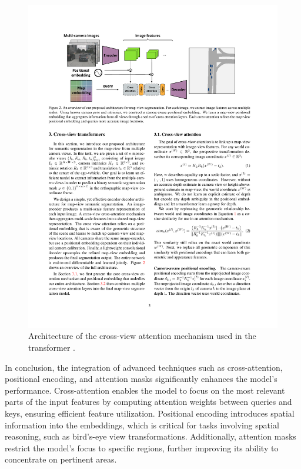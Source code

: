 \begin{figure}[H]
    \centering
    \includegraphics[width=1\linewidth]{LateX//figs/2205.02833v1.pdf}
    \caption{Architecture of the cross-view attention mechanism used in the transformer \cite{zhou2022crossviewtransformersrealtimemapview}.}
    \label{fig:bev-transformer}
\end{figure}

In conclusion, the integration of advanced techniques such as cross-attention, positional encoding, and attention masks significantly enhances the model's performance. Cross-attention enables the model to focus on the most relevant parts of the input features by computing attention weights between queries and keys, ensuring efficient feature utilization. Positional encoding introduces spatial information into the embeddings, which is critical for tasks involving spatial reasoning, such as bird’s-eye view transformations. Additionally, attention masks restrict the model's focus to specific regions, further improving its ability to concentrate on pertinent areas.

